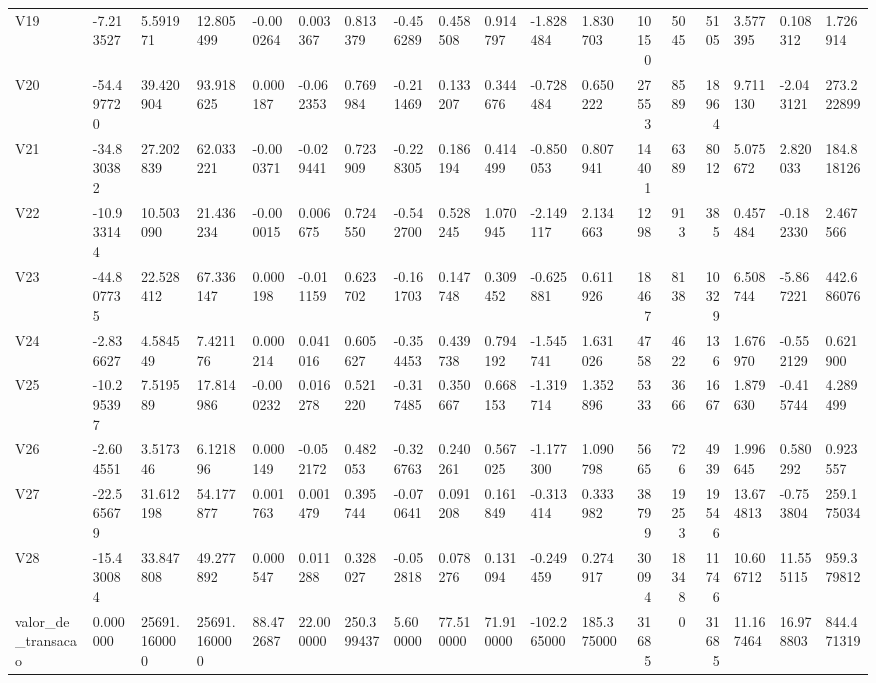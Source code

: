 \begin{longtable}{llllllllllllrrrlll}
V19 & -7.213527 & 5.591971 & 12.805499 & -0.000264 & 0.003367 & 0.813379 & -0.456289 & 0.458508 & 0.914797 & -1.828484 & 1.830703 & 10150 & 5045 & 5105 & 3.577395 & 0.108312 & 1.726914 \\
V20 & -54.497720 & 39.420904 & 93.918625 & 0.000187 & -0.062353 & 0.769984 & -0.211469 & 0.133207 & 0.344676 & -0.728484 & 0.650222 & 27553 & 8589 & 18964 & 9.711130 & -2.043121 & 273.222899 \\
V21 & -34.830382 & 27.202839 & 62.033221 & -0.000371 & -0.029441 & 0.723909 & -0.228305 & 0.186194 & 0.414499 & -0.850053 & 0.807941 & 14401 & 6389 & 8012 & 5.075672 & 2.820033 & 184.818126 \\
V22 & -10.933144 & 10.503090 & 21.436234 & -0.000015 & 0.006675 & 0.724550 & -0.542700 & 0.528245 & 1.070945 & -2.149117 & 2.134663 & 1298 & 913 & 385 & 0.457484 & -0.182330 & 2.467566 \\
V23 & -44.807735 & 22.528412 & 67.336147 & 0.000198 & -0.011159 & 0.623702 & -0.161703 & 0.147748 & 0.309452 & -0.625881 & 0.611926 & 18467 & 8138 & 10329 & 6.508744 & -5.867221 & 442.686076 \\
V24 & -2.836627 & 4.584549 & 7.421176 & 0.000214 & 0.041016 & 0.605627 & -0.354453 & 0.439738 & 0.794192 & -1.545741 & 1.631026 & 4758 & 4622 & 136 & 1.676970 & -0.552129 & 0.621900 \\
V25 & -10.295397 & 7.519589 & 17.814986 & -0.000232 & 0.016278 & 0.521220 & -0.317485 & 0.350667 & 0.668153 & -1.319714 & 1.352896 & 5333 & 3666 & 1667 & 1.879630 & -0.415744 & 4.289499 \\
V26 & -2.604551 & 3.517346 & 6.121896 & 0.000149 & -0.052172 & 0.482053 & -0.326763 & 0.240261 & 0.567025 & -1.177300 & 1.090798 & 5665 & 726 & 4939 & 1.996645 & 0.580292 & 0.923557 \\
V27 & -22.565679 & 31.612198 & 54.177877 & 0.001763 & 0.001479 & 0.395744 & -0.070641 & 0.091208 & 0.161849 & -0.313414 & 0.333982 & 38799 & 19253 & 19546 & 13.674813 & -0.753804 & 259.175034 \\
V28 & -15.430084 & 33.847808 & 49.277892 & 0.000547 & 0.011288 & 0.328027 & -0.052818 & 0.078276 & 0.131094 & -0.249459 & 0.274917 & 30094 & 18348 & 11746 & 10.606712 & 11.555115 & 959.379812 \\
valor\_de\_transacao & 0.000000 & 25691.160000 & 25691.160000 & 88.472687 & 22.000000 & 250.399437 & 5.600000 & 77.510000 & 71.910000 & -102.265000 & 185.375000 & 31685 & 0 & 31685 & 11.167464 & 16.978803 & 844.471319 \\
\end{longtable}
